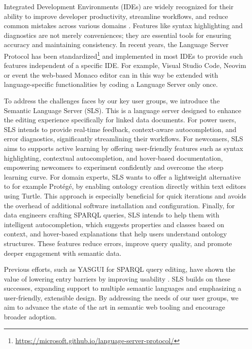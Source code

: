 Integrated Development Environments (IDEs) are widely recognized for their ability to improve developer productivity, streamline workflows, and reduce common mistakes across various domains \cite{javaEngineer}. 
Features like syntax highlighting and diagnostics are not merely conveniences; they are essential tools for ensuring accuracy and maintaining consistency. 
In recent years, the Language Server Protocol has been standardized\footnote{\url{https://microsoft.github.io/language-server-protocol/}} and implemented in most IDEs to provide such features independent of a specific IDE.
For example, Visual Studio Code, Neovim or event the web-based Monaco editor can in this way be extended with language-specific functionalities by coding a Language Server only once.

To address the challenges faces by our key user groups, we introduce the Semantic Language Server (SLS).
This is a language server designed to enhance the editing experience specifically for linked data documents. 
For power users, SLS intends to provide real-time feedback, context-aware autocompletion, and error diagnostics, significantly streamlining their workflows.
For newcomers, SLS aims to supports active learning by offering user-friendly features such as syntax highlighting, contextual autocompletion, and hover-based documentation, empowering newcomers to experiment confidently and overcome the steep learning curve.
For domain experts, SLS wants to offer a lightweight alternative to for example Protégé, by enabling ontology creation directly within text editors using Turtle.
This approach is especially beneficial for quick iterations and avoids the overhead of additional software installation and configuration.
Finally, for data engineers crafting SPARQL queries, SLS intends to help them with intelligent autocompletion, which suggests properties and classes based on context, and hover-based explanations that help users understand ontology structures.
These features reduce errors, improve query quality, and promote deeper engagement with semantic data.


Previous efforts, such as YASGUI for SPARQL query editing, have shown the value of lowering entry barriers by improving usability \cite{10.3233/SW-150197,10.1007/978-3-642-41242-4_7}. 
SLS builds on these successes, expanding support to multiple semantic languages and emphasizing a user-friendly, extensible design. 
By addressing the needs of our user groups, we aim to advance the state of the art in semantic web tooling and encourage broader adoption.
